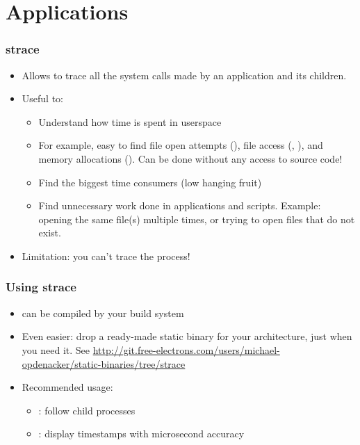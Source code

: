 \section{Applications}

\begin{frame}
\frametitle{strace}
\begin{itemize}
	\item Allows to trace all the system calls made by an
              application and its children. 
	\item Useful to:
	\begin{itemize}
		\item Understand how time is spent in userspace
 		\item For example, easy to find file open attempts (),
		      file access (, ), and 
		      memory allocations (). Can be done 
		      without any access to source code!
		\item Find the biggest time consumers
 		      (low hanging fruit)
  		\item Find unnecessary work done in applications
		      and scripts. Example: opening the same file(s)
		      multiple times, or trying to open files that
		      do not exist.
	\end{itemize}
	\item Limitation: you can't trace the  process!
\end{itemize}
\end{frame}

\begin{frame}
\frametitle{Using strace}
\begin{itemize}
	\item {} can be compiled by your build system
	\item Even easier: drop a ready-made static binary for your
	      architecture, just when you need it. See 
	      \url{http://git.free-electrons.com/users/michael-opdenacker/static-binaries/tree/strace}
	\item Recommended usage: \\
        \begin{itemize}
	      \item {}: follow child processes
	      \item {}: display timestamps with microsecond accuracy  
	\end{itemize}
\end{itemize}
\end{frame}

